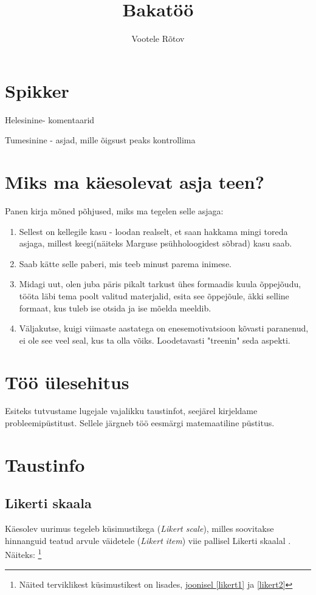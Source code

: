 \documentclass[a4paper]{article}
\author{Vootele Rõtov}
\title{Bakatöö}
\numberwithin{equation}{section}
\theoremstyle{definition}
\begin{document}
\maketitle

\pagebreak

\tableofcontents

\pagebreak

\section*{Spikker}

{\color{cyan} Helesinine- komentaarid}

{\color{blue} Tumesinine - asjad, mille õigsust peaks kontrollima}


{\color{cyan}\section*{Miks ma käesolevat asja teen?}

Panen kirja mõned põhjused, miks ma tegelen selle asjaga:
\begin{enumerate}[I]
\item Sellest on kellegile kasu - loodan realselt, et saan hakkama mingi toreda asjaga, millest keegi(näiteks Marguse psühholoogidest sõbrad) kasu saab.
\item Saab kätte selle paberi, mis teeb minust parema inimese. 
\item Midagi uut, olen juba päris pikalt tarkust ühes formaadis kuula õppejõudu, tööta läbi tema poolt valitud materjalid, esita see õppejõule, äkki selline formaat, kus tuleb ise otsida ja ise mõelda meeldib.
\item Väljakutse, kuigi viimaste aastatega on enesemotivatsioon kõvasti paranenud, ei ole see veel seal, kus ta olla võiks. Loodetavasti "treenin" seda aspekti.
\end{enumerate}}

\section{Töö \"ulesehitus}
Esiteks tutvustame lugejale vajalikku taustinfot, seejärel kirjeldame probleemip\"ustitust. Sellele järgneb töö eesmärgi matemaatiline p\"ustitus.

\section{Taustinfo}

\subsection{Likerti skaala
}
Käesolev uurimus tegeleb k\"usimustikega (\textit{Likert scale}), milles soovitakse hinnanguid teatud arvule väidetele (\textit{Likert item}) viie pallisel Likerti skaalal \cite{Edmondson}. Näiteks: \footnote{Näited terviklikest k\"usimustikest on lisades, \hyperref[likert1]{joonisel \ref*{likert1}} ja \hyperref[likert2]{ \ref*{likert2}}}
\end{document}
